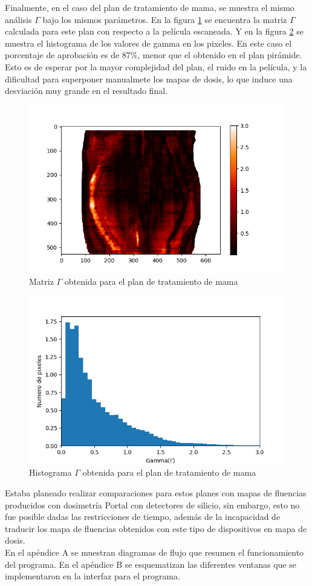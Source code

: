 Finalmente, en el caso del plan de tratamiento de mama, se muestra el mismo análisis $\Gamma$ bajo los mismos parámetros. En la figura \ref{fig:matrixGAmmaMAma} se encuentra la matriz $\Gamma$ calculada para este plan con respecto a la película escaneada. Y en la figura \ref{fig:histogramaGAmmaMama} se muestra el histograma de los valores de gamma en los pixeles. En este caso el porcentaje de aprobación es de 87\%, menor que el obtenido en el plan pirámide. Esto es de esperar por la mayor complejidad del plan, el ruido en la película, y la dificultad para superponer manualmete los mapas de dosis, lo que induce una desviación muy grande en el resultado final.\\

\begin{figure}[H]
	\centering
	\includegraphics[width=0.7\linewidth]{images/gammaMama.png}
	\caption{Matriz $\Gamma$ obtenida para el plan de tratamiento de mama }
	\label{fig:matrixGAmmaMAma}
\end{figure}
\begin{figure}[H]
	\centering
	\includegraphics[width=0.7\linewidth]{images/histogramaDosisMama.png}
	\caption{Histograma $\Gamma$ obtenida para el plan de tratamiento de mama  }
	\label{fig:histogramaGAmmaMama}
\end{figure}

Estaba planeado realizar comparaciones para estos planes con mapas de fluencias producidos con dosimetría Portal con detectores de silicio, sin embargo, esto no fue posible dadas las restricciones de tiempo, además de la incapacidad de traducir los mapa de fluencias obtenidos con este tipo de dispositivos en mapa de dosis.\\

En el apéndice A se muestran diagramas de flujo que resumen el funcionamiento del programa. En el apéndice B se esquematizan las diferentes ventanas que se implementaron en la interfaz para el programa.\\ 





